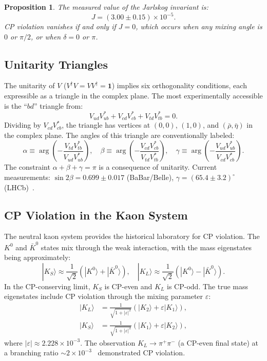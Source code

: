 \documentclass[12pt]{article}
\newtheorem{proposition}[theorem]{Proposition}
\theoremstyle{definition}
\theoremstyle{remark}
\newcommand{\ket}[1]{| #1 \rangle}
\begin{document}
\begin{proposition}
\label{prop:jarlskog_value}
The measured value of the Jarlskog invariant is:
\begin{equation}
J = (3.00 \pm 0.15) \times 10^{-5}.
\end{equation}
CP violation vanishes if and only if $J = 0$, which occurs when any mixing angle
is $0$ or $\pi/2$, or when $\delta = 0$ or $\pi$.
\end{proposition}

\subsection{Unitarity Triangles}

The unitarity of $V$ ($V^\dagger V = VV^\dagger = \mathbf{1}$) implies six
orthogonality conditions, each expressible as a triangle in the complex plane.
The most experimentally accessible is the ``$bd$'' triangle from:
\begin{equation}
\label{eq:unitarity_triangle}
V_{ud}V_{ub}^* + V_{cd}V_{cb}^* + V_{td}V_{tb}^* = 0.
\end{equation}
Dividing by $V_{cd}V_{cb}^*$, the triangle has vertices at $(0,0)$, $(1,0)$, and
$(\bar{\rho}, \bar{\eta})$ in the complex plane. The angles of this triangle are
conventionally labeled:
\begin{equation}
\alpha \equiv \arg\left(-\frac{V_{td}V_{tb}^*}{V_{ud}V_{ub}^*}\right), \quad
\beta \equiv \arg\left(-\frac{V_{cd}V_{cb}^*}{V_{td}V_{tb}^*}\right), \quad
\gamma \equiv \arg\left(-\frac{V_{ud}V_{ub}^*}{V_{cd}V_{cb}^*}\right).
\end{equation}
The constraint $\alpha + \beta + \gamma = \pi$ is a consequence of unitarity.
Current measurements: $\sin 2\beta = 0.699 \pm 0.017$ (BaBar/Belle),
$\gamma = (65.4 \pm 3.2)^\circ$ (LHCb)~\cite{PDG2024}.

\subsection{CP Violation in the Kaon System}

The neutral kaon system provides the historical laboratory for CP violation.
The $K^0$ and $\bar{K}^0$ states mix through the weak interaction, with the
mass eigenstates being approximately:
\begin{equation}
\ket{K_S} \approx \frac{1}{\sqrt{2}}(\ket{K^0} + \ket{\bar{K}^0}), \quad
\ket{K_L} \approx \frac{1}{\sqrt{2}}(\ket{K^0} - \ket{\bar{K}^0}).
\end{equation}
In the CP-conserving limit, $K_S$ is CP-even and $K_L$ is CP-odd.
The true mass eigenstates include CP violation through the mixing parameter $\varepsilon$:
\begin{align}
\ket{K_L} &= \frac{1}{\sqrt{1+|\varepsilon|^2}}(\ket{K_2} + \varepsilon\ket{K_1}), \\
\ket{K_S} &= \frac{1}{\sqrt{1+|\varepsilon|^2}}(\ket{K_1} + \varepsilon\ket{K_2}),
\end{align}
where $|\varepsilon| \approx 2.228 \times 10^{-3}$.
The observation $K_L \to \pi^+\pi^-$ (a CP-even final state) at a branching ratio
$\sim 2 \times 10^{-3}$~\cite{CroninFitch1964} demonstrated CP violation.
\end{document}
